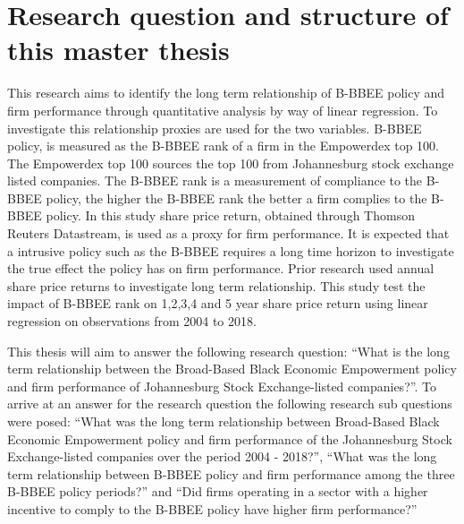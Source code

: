 \section{Research question and structure of this master thesis}
This research aims to identify the long term relationship of B-BBEE policy and firm performance through quantitative analysis by way of linear regression. To investigate this relationship proxies are used for the two variables. B-BBEE policy, is measured as the B-BBEE rank of a firm in the Empowerdex top 100. The Empowerdex top 100 sources the top 100 from Johannesburg stock exchange listed companies. The B-BBEE rank is a measurement of compliance to the B-BBEE policy, the higher the B-BBEE rank the better a firm complies to the B-BBEE policy. In this study share price return, obtained through Thomson Reuters Datastream, is used as a proxy for firm performance. It is expected that a intrusive policy such as the B-BBEE requires a long time horizon to investigate the true effect the policy has on firm performance. Prior research used annual share price returns to investigate long term relationship. This study test the impact of B-BBEE rank on 1,2,3,4 and 5 year share price return using linear regression on observations from 2004 to 2018. 

This thesis will aim to answer the following research question: “What is the long term relationship between the Broad-Based Black Economic Empowerment policy and firm performance of Johannesburg Stock Exchange-listed companies?”.  To arrive at an answer for the research question the following research sub questions were posed: “What was the long term relationship between Broad-Based Black Economic Empowerment policy and firm performance of the Johannesburg Stock Exchange-listed companies over the period 2004 - 2018?”, “What was the long term relationship between B-BBEE policy and firm performance among the three B-BBEE policy periods?” and  “Did firms operating in a sector with a higher incentive to comply to the B-BBEE policy have higher firm performance?”

